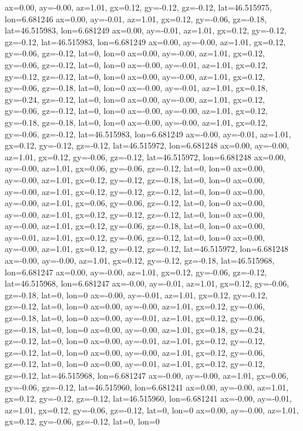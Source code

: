 ax=0.00, ay=-0.00, az=1.01, gx=0.12, gy=-0.12, gz=-0.12, lat=46.515975, lon=6.681246
ax=0.00, ay=-0.01, az=1.01, gx=0.12, gy=-0.06, gz=-0.18, lat=46.515983, lon=6.681249
ax=0.00, ay=-0.01, az=1.01, gx=0.12, gy=-0.12, gz=-0.12, lat=46.515983, lon=6.681249
ax=0.00, ay=-0.00, az=1.01, gx=0.12, gy=-0.06, gz=-0.12, lat=0, lon=0
ax=0.00, ay=-0.00, az=1.01, gx=0.12, gy=-0.06, gz=-0.12, lat=0, lon=0
ax=-0.00, ay=-0.01, az=1.01, gx=0.12, gy=-0.12, gz=-0.12, lat=0, lon=0
ax=0.00, ay=-0.00, az=1.01, gx=0.12, gy=-0.06, gz=-0.18, lat=0, lon=0
ax=-0.00, ay=-0.01, az=1.01, gx=0.18, gy=-0.24, gz=-0.12, lat=0, lon=0
ax=0.00, ay=-0.00, az=1.01, gx=0.12, gy=-0.06, gz=-0.12, lat=0, lon=0
ax=-0.00, ay=-0.00, az=1.01, gx=0.12, gy=-0.18, gz=-0.18, lat=0, lon=0
ax=-0.00, ay=-0.00, az=1.01, gx=0.12, gy=-0.06, gz=-0.12, lat=46.515983, lon=6.681249
ax=-0.00, ay=-0.01, az=1.01, gx=0.12, gy=-0.12, gz=-0.12, lat=46.515972, lon=6.681248
ax=0.00, ay=-0.00, az=1.01, gx=0.12, gy=-0.06, gz=-0.12, lat=46.515972, lon=6.681248
ax=0.00, ay=-0.00, az=1.01, gx=0.06, gy=-0.06, gz=-0.12, lat=0, lon=0
ax=0.00, ay=-0.00, az=1.01, gx=0.12, gy=-0.12, gz=-0.18, lat=0, lon=0
ax=0.00, ay=-0.00, az=1.01, gx=0.12, gy=-0.12, gz=-0.12, lat=0, lon=0
ax=0.00, ay=-0.00, az=1.01, gx=0.06, gy=-0.06, gz=-0.12, lat=0, lon=0
ax=0.00, ay=-0.00, az=1.01, gx=0.12, gy=-0.12, gz=-0.12, lat=0, lon=0
ax=0.00, ay=-0.00, az=1.01, gx=0.12, gy=-0.06, gz=-0.18, lat=0, lon=0
ax=0.00, ay=-0.01, az=1.01, gx=0.12, gy=-0.06, gz=-0.12, lat=0, lon=0
ax=0.00, ay=-0.00, az=1.01, gx=0.12, gy=-0.12, gz=-0.12, lat=46.515972, lon=6.681248
ax=-0.00, ay=-0.00, az=1.01, gx=0.12, gy=-0.12, gz=-0.18, lat=46.515968, lon=6.681247
ax=0.00, ay=-0.00, az=1.01, gx=0.12, gy=-0.06, gz=-0.12, lat=46.515968, lon=6.681247
ax=-0.00, ay=-0.01, az=1.01, gx=0.12, gy=-0.06, gz=-0.18, lat=0, lon=0
ax=-0.00, ay=-0.01, az=1.01, gx=0.12, gy=-0.12, gz=-0.12, lat=0, lon=0
ax=0.00, ay=-0.00, az=1.01, gx=0.12, gy=-0.06, gz=-0.18, lat=0, lon=0
ax=0.00, ay=-0.01, az=1.01, gx=0.12, gy=-0.06, gz=-0.18, lat=0, lon=0
ax=0.00, ay=-0.00, az=1.01, gx=0.18, gy=-0.24, gz=-0.12, lat=0, lon=0
ax=0.00, ay=-0.01, az=1.01, gx=0.12, gy=-0.12, gz=-0.12, lat=0, lon=0
ax=0.00, ay=-0.00, az=1.01, gx=0.12, gy=-0.06, gz=-0.12, lat=0, lon=0
ax=0.00, ay=-0.01, az=1.01, gx=0.12, gy=-0.12, gz=-0.12, lat=46.515968, lon=6.681247
ax=-0.00, ay=-0.00, az=1.01, gx=0.06, gy=-0.06, gz=-0.12, lat=46.515960, lon=6.681241
ax=0.00, ay=-0.00, az=1.01, gx=0.12, gy=-0.12, gz=-0.12, lat=46.515960, lon=6.681241
ax=-0.00, ay=-0.01, az=1.01, gx=0.12, gy=-0.06, gz=-0.12, lat=0, lon=0
ax=0.00, ay=-0.00, az=1.01, gx=0.12, gy=-0.06, gz=-0.12, lat=0, lon=0
